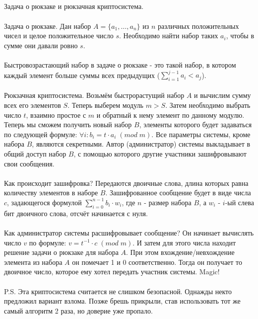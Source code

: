 \documentclass[a4paper,10pt]{article} %
\begin{document}
	\subsection{}
	Задача о рюкзаке и рюкзачная криптосистема.
	\\\\
	Задача о рюкзаке. Дан набор $A = \{a_{1}, \ldots, a_{n}\}$ из $n$ различных положительных чисел и целое положительное число $s$. Необходимо найти набор таких $a_{i}$, чтобы в сумме они давали ровно $s$.
	\\\\
	Быстровозрастающий набор в задаче о рюкзаке - это такой набор, в котором каждый элемент больше суммы всех предыдущих ($\sum_{i = 1}^{j - 1} a_{i} < a_{j}$).
	\\\\
	Рюкзачная криптосистема. Возьмём быстрорастущий набор $A$ и вычислим сумму всех его элементов $S$. Теперь выберем модуль $m > S$. Затем необходимо выбрать число $t$, взаимно простое с $m$ и обратный к нему элемент по данному модулю. Теперь мы сможем получить новый набор $B$, элементы которого будет задаваться по следующей формуле: $\forall i: b_{i} = t \cdot a_{i} \;(mod \; m)$.
	Все параметры системы, кроме набора $B$, являются секретными. Автор (администратор) системы выкладывает в общий доступ набор $B$, с помощью которого другие участники зашифровывают свои сообщения.
	\\\\
	Как происходит зашифровка? Передаются двоичные слова, длина которых равна количеству элементов в наборе $B$. Зашифрованное сообщение будет в виде числа $c$, задающегося формулой $\sum_{i = 0}^{n - 1} b_{i} \cdot w_{i}$, где $n$ - размер набора $B$, а $w_{i}$ - $i$-ый слева бит двоичного слова, отсчёт начинается с нуля.
	\\\\
	Как администратор системы расшифровывает сообщение? Он начинает вычислять число $v$ по формуле: $v = t^{-1} \cdot c \; (mod \; m)$. И затем для этого числа находит решение задачи о рюкзаке для набора $A$. При этом вхождение/невхождение элемента из набора $A$ он помечает 1 и 0 соответственно. Тогда он получает то двоичное число, которое ему хотел передать участник системы. Magic!
	\\\\
	P.S. Эта криптосистема считается не слишком безопасной. Однажды некто предложил вариант взлома. Позже брешь прикрыли, став использовать тот же самый алгоритм 2 раза, но доверие уже пропало.
\end{document}
